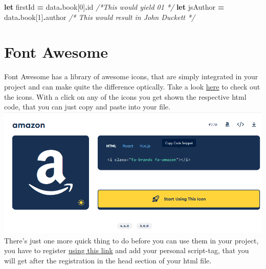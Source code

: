 \documentclass[
]{book}
\newenvironment{Shaded}{\begin{snugshade}}{\end{snugshade}}
\newcommand{\AttributeTok}[1]{\textcolor[rgb]{0.77,0.63,0.00}{#1}}
\newcommand{\CommentTok}[1]{\textcolor[rgb]{0.56,0.35,0.01}{\textit{#1}}}
\newcommand{\DecValTok}[1]{\textcolor[rgb]{0.00,0.00,0.81}{#1}}
\newcommand{\KeywordTok}[1]{\textcolor[rgb]{0.13,0.29,0.53}{\textbf{#1}}}
\newcommand{\NormalTok}[1]{#1}
\newcommand{\OperatorTok}[1]{\textcolor[rgb]{0.81,0.36,0.00}{\textbf{#1}}}
\begin{document}
\begin{Shaded}
\begin{Highlighting}[]
\KeywordTok{let}\NormalTok{ firstId }\OperatorTok{=}\NormalTok{ data}\OperatorTok{.}\AttributeTok{book}\NormalTok{[}\DecValTok{0}\NormalTok{]}\OperatorTok{.}\AttributeTok{id} \CommentTok{/*This would yield 01 */}
\KeywordTok{let}\NormalTok{ jsAuthor }\OperatorTok{=}\NormalTok{ data}\OperatorTok{.}\AttributeTok{book}\NormalTok{[}\DecValTok{1}\NormalTok{]}\OperatorTok{.}\AttributeTok{author} \CommentTok{/* This would result in John Duckett */}  
\end{Highlighting}
\end{Shaded}

\hypertarget{font-awesome}{%
\section{Font Awesome}\label{font-awesome}}

Font Awesome has a library of awesome icons, that are simply integrated in your project and can make quite the difference optically.
Take a look \href{https://fontawesome.com/search?m=free}{here} to check out the icons. With a click on any of the icons you get shown the respective html code, that you can just copy and paste into your file.
\includegraphics{docs/assets/font-awesome.png}
There's just one more quick thing to do before you can use them in your project, you have to register \href{https://fontawesome.com/v6/docs/web/setup/get-started}{using this link} and add your personal script-tag, that you will get after the registration in the head section of your html file.
\end{document}
